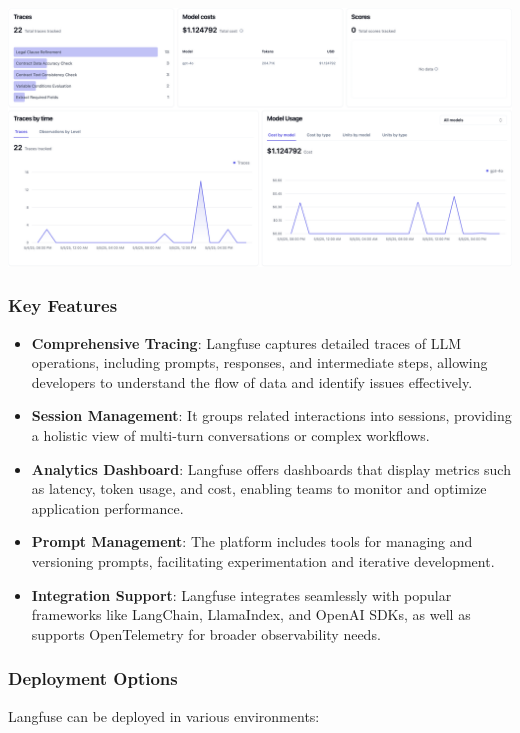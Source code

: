 \begin{center}
    \centering
    \includegraphics[width=1\textwidth]{Images/Langfuse Overview.png}
    \label{fig:langfuseDashboard}
\end{center}

\subsubsection{Key Features}
\begin{itemize}
    \item \textbf{Comprehensive Tracing}: Langfuse captures detailed traces of LLM operations, including prompts, responses, and intermediate steps, allowing developers to understand the flow of data and identify issues effectively.
    \item \textbf{Session Management}: It groups related interactions into sessions, providing a holistic view of multi-turn conversations or complex workflows.
    \item \textbf{Analytics Dashboard}: Langfuse offers dashboards that display metrics such as latency, token usage, and cost, enabling teams to monitor and optimize application performance.
    \item \textbf{Prompt Management}: The platform includes tools for managing and versioning prompts, facilitating experimentation and iterative development.
    \item \textbf{Integration Support}: Langfuse integrates seamlessly with popular frameworks like LangChain, LlamaIndex, and OpenAI SDKs, as well as supports OpenTelemetry for broader observability needs.
\end{itemize}

\subsubsection{Deployment Options}
Langfuse can be deployed in various environments:

